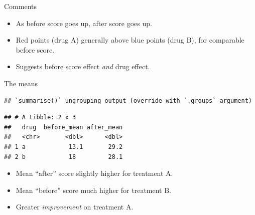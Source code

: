 \documentclass[
  ignorenonframetext,
]{beamer}
\newenvironment{Shaded}{\begin{snugshade}}{\end{snugshade}}
\newcommand{\DataTypeTok}[1]{\textcolor[rgb]{0.13,0.29,0.53}{#1}}
\newcommand{\KeywordTok}[1]{\textcolor[rgb]{0.13,0.29,0.53}{\textbf{#1}}}
\newcommand{\NormalTok}[1]{#1}
\newcommand{\OperatorTok}[1]{\textcolor[rgb]{0.81,0.36,0.00}{\textbf{#1}}}
\newcommand{\StringTok}[1]{\textcolor[rgb]{0.31,0.60,0.02}{#1}}
\begin{document}
\begin{frame}{Comments}
\protect\hypertarget{comments-20}{}

\begin{itemize}
\item
  As before score goes up, after score goes up.
\item
  Red points (drug A) generally above blue points (drug B), for
  comparable before score.
\item
  Suggests before score effect \emph{and} drug effect.
\end{itemize}

\end{frame}

\begin{frame}[fragile]{The means}
\protect\hypertarget{the-means}{}

\begin{Shaded}
\end{Shaded}

\begin{verbatim}
## `summarise()` ungrouping output (override with `.groups` argument)
\end{verbatim}

\begin{verbatim}
## # A tibble: 2 x 3
##   drug  before_mean after_mean
##   <chr>       <dbl>      <dbl>
## 1 a            13.1       29.2
## 2 b            18         28.1
\end{verbatim}

\begin{itemize}
\item
  Mean ``after'' score slightly higher for treatment A.
\item
  Mean ``before'' score much higher for treatment B.
\item
  Greater \emph{improvement} on treatment A.
\end{itemize}

\end{frame}
\end{document}
